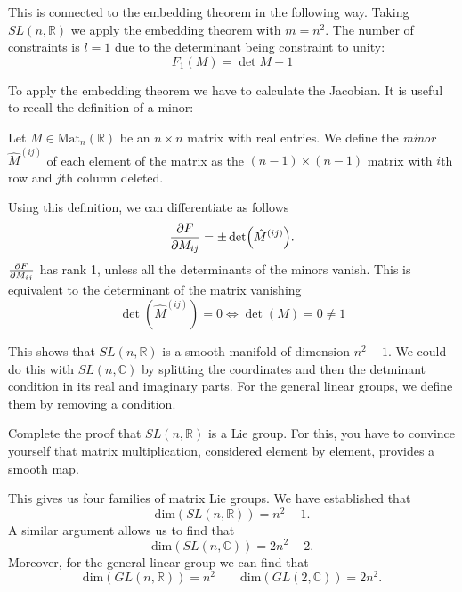 This is connected to the embedding theorem in the following way.
Taking $SL(n, \mathbb{R})$ we apply the embedding theorem with $m = n^2$. The number of constraints is $l = 1$ due to the determinant being constraint to unity:
\begin{equation}
  F_1(M) = \det M - 1
\end{equation}

To apply the embedding theorem we have to calculate the Jacobian. 
It is useful to recall the definition of a minor:
\begin{definition}[minor]
  Let $M \in \text{Mat}_n(\mathbb{R})$ be an $n \times n$ matrix with real entries. We define the \emph{minor} $\hat M^{(ij)}$ of each element of the matrix as the $(n-1) \times (n-1)$ matrix with $i$th row and $j$th column deleted.
\end{definition}
Using this definition, we can differentiate as follows
\begin{equation}
  \pdv{F}{M_{ij}} = \pm \det(\hat M^{(ij)}).
\end{equation}
$\pdv{F}{M_{ij}}$ has rank 1, unless all the determinants of the minors vanish.
This is equivalent to the determinant of the matrix vanishing
\begin{equation}
  \det(\hat M^{(ij)}) = 0 \iff \det(M) = 0 \neq 1
\end{equation}

This shows that $SL(n, \mathbb{R})$ is a smooth manifold of dimension $n^2 - 1$.
We could do this with $SL(n, \mathbb{C})$ by splitting the coordinates and then the detminant condition in its real and imaginary parts. For the general linear groups, we define them by removing a condition.

\begin{exercise}
  Complete the proof that $SL(n, \mathbb{R})$ is a Lie group. For this, you have to convince yourself that matrix multiplication, considered element by element, provides a smooth map.
\end{exercise}

This gives us four families of matrix Lie groups.
We have established that
\begin{equation}
  \text{dim}(SL(n, \mathbb{R})) = n^2 - 1.
\end{equation}
A similar argument allows us to find that
\begin{equation}
  \text{dim}(SL(n, \mathbb{C})) = 2n^2 - 2.
\end{equation}
Moreover, for the general linear group we can find that
\begin{equation}
  \text{dim}(GL(n, \mathbb{R})) = n^2 \qquad \text{dim}(GL(2, \mathbb{C})) = 2n^2.
\end{equation}

